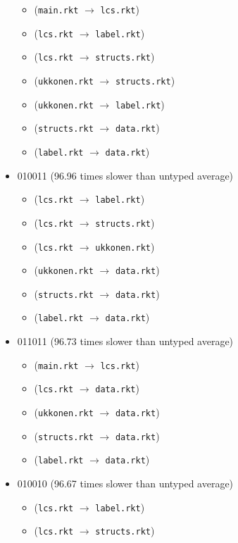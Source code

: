 \documentclass{article}
\newcommand{\mono}[1]{\texttt{#1}}
\begin{document}
\begin{itemize}
  \begin{itemize}
  \item (\mono{main.rkt} $\rightarrow$ \mono{lcs.rkt})
  \item (\mono{lcs.rkt} $\rightarrow$ \mono{label.rkt})
  \item (\mono{lcs.rkt} $\rightarrow$ \mono{structs.rkt})
  \item (\mono{ukkonen.rkt} $\rightarrow$ \mono{structs.rkt})
  \item (\mono{ukkonen.rkt} $\rightarrow$ \mono{label.rkt})
  \item (\mono{structs.rkt} $\rightarrow$ \mono{data.rkt})
  \item (\mono{label.rkt} $\rightarrow$ \mono{data.rkt})
  \end{itemize}
\item 010011 (96.96 times slower than untyped average)
  \begin{itemize}
  \item (\mono{lcs.rkt} $\rightarrow$ \mono{label.rkt})
  \item (\mono{lcs.rkt} $\rightarrow$ \mono{structs.rkt})
  \item (\mono{lcs.rkt} $\rightarrow$ \mono{ukkonen.rkt})
  \item (\mono{ukkonen.rkt} $\rightarrow$ \mono{data.rkt})
  \item (\mono{structs.rkt} $\rightarrow$ \mono{data.rkt})
  \item (\mono{label.rkt} $\rightarrow$ \mono{data.rkt})
  \end{itemize}
\item 011011 (96.73 times slower than untyped average)
  \begin{itemize}
  \item (\mono{main.rkt} $\rightarrow$ \mono{lcs.rkt})
  \item (\mono{lcs.rkt} $\rightarrow$ \mono{data.rkt})
  \item (\mono{ukkonen.rkt} $\rightarrow$ \mono{data.rkt})
  \item (\mono{structs.rkt} $\rightarrow$ \mono{data.rkt})
  \item (\mono{label.rkt} $\rightarrow$ \mono{data.rkt})
  \end{itemize}
\item 010010 (96.67 times slower than untyped average)
  \begin{itemize}
  \item (\mono{lcs.rkt} $\rightarrow$ \mono{label.rkt})
  \item (\mono{lcs.rkt} $\rightarrow$ \mono{structs.rkt})

\end{itemize}
\end{itemize}
\end{document}

